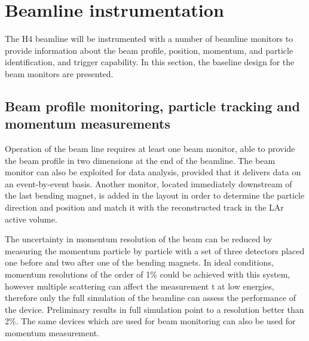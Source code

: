 \section{Beamline instrumentation}
\label{sec:beaminstruments}

The H4 beamline will be instrumented with a number of beamline monitors to provide information 
 about the beam profile, position, momentum, and particle identification, and trigger capability. 
 In this section, the baseline design for the beam monitors are presented. 

\subsection{Beam profile monitoring, particle tracking and momentum measurements}
Operation of the beam line requires at least one beam  monitor, able to provide the beam profile in two dimensions at the end of the beamline.   The beam monitor can also be exploited for data analysis, provided that it delivers data on an event-by-event basis. Another monitor, located immediately downstream of the last bending magnet, is added in the layout  in order to determine the particle  direction and position and match it with the reconstructed track in the LAr active volume.

The uncertainty in momentum resolution of the beam can be reduced by measuring the momentum particle by particle with a set of three detectors placed one before and two after one of the bending magnets. In ideal conditions, momentum resolutions of the order of 1\% could be achieved with this system, however  multiple scattering can affect the measurement
t at low energies, therefore only the  full simulation of the beamline can assess the performance of the device.  
Preliminary results in full simulation point to a resolution better than 2\%. The same devices which are used for beam monitoring can also be used for momentum measurement.
%
